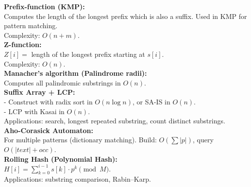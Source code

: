 \textbf{Prefix-function (KMP):} \\[1mm]
Computes the length of the longest prefix which is also a suffix. Used in KMP for pattern matching. \\
Complexity: $O(n+m)$. \\

\textbf{Z-function:} \\[1mm]
$Z[i] =$ length of the longest prefix starting at $s[i]$. \\
Complexity: $O(n)$. \\

\textbf{Manacher’s algorithm (Palindrome radii):} \\[1mm]
Computes all palindromic substrings in $O(n)$. \\

\textbf{Suffix Array + LCP:} \\[1mm]
- Construct with radix sort in $O(n\log n)$, or SA-IS in $O(n)$. \\
- LCP with Kasai in $O(n)$. \\
Applications: search, longest repeated substring, count distinct substrings. \\

\textbf{Aho-Corasick Automaton:} \\[1mm]
For multiple patterns (dictionary matching). Build: $O(\sum |p|)$, query $O(|text|+occ)$. \\

\textbf{Rolling Hash (Polynomial Hash):} \\[1mm]
$H[i]=\sum_{k=0}^{i-1} s[k]\cdot p^k \pmod M$. \\
Applications: substring comparison, Rabin–Karp. \\